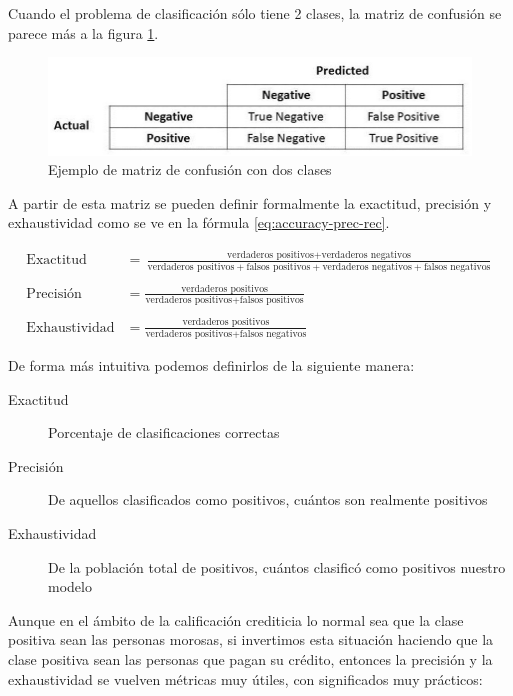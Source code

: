 Cuando el problema de clasificación sólo tiene 2 clases, la matriz de confusión se parece más a la figura \ref{fig:confussion2}.

\begin{figure}[htbp]
    \centering
    \includegraphics[width=0.8\linewidth]{graficos/confussion_matrix_2.png}
    \caption{Ejemplo de matriz de confusión con dos clases}
    \label{fig:confussion2}
\end{figure}

A partir de esta matriz se pueden definir formalmente la exactitud, precisión y exhaustividad como se ve en la fórmula \ref{eq:accuracy-prec-rec}.

\begin{equation}
    \label{eq:accuracy-prec-rec}
\begin{split}
    \text{Exactitud}  &= \frac{\text{verdaderos positivos} + \text{verdaderos negativos}}{\text{verdaderos positivos} + \text{falsos positivos} + \text{verdaderos negativos} + \text{falsos negativos}} \\\\
    \text{Precisión} &= \frac{\text{verdaderos positivos}}{\text{verdaderos positivos} + \text{falsos positivos}} \\\\
    \text{Exhaustividad}    &= \frac{\text{verdaderos positivos}}{\text{verdaderos positivos} + \text{falsos negativos}} 
\end{split}
\end{equation}

De forma más intuitiva podemos definirlos de la siguiente manera:

\begin{description}
    \item [Exactitud] Porcentaje de clasificaciones correctas
    \item [Precisión] De aquellos clasificados como positivos, cuántos son realmente positivos
    \item [Exhaustividad] De la población total de positivos, cuántos clasificó como positivos nuestro modelo
\end{description}

Aunque en el ámbito de la calificación crediticia lo normal sea que la clase positiva sean las personas morosas, si invertimos esta situación haciendo que la clase positiva sean las personas que pagan su crédito, entonces la precisión y la exhaustividad se vuelven métricas muy útiles, con significados muy prácticos:

